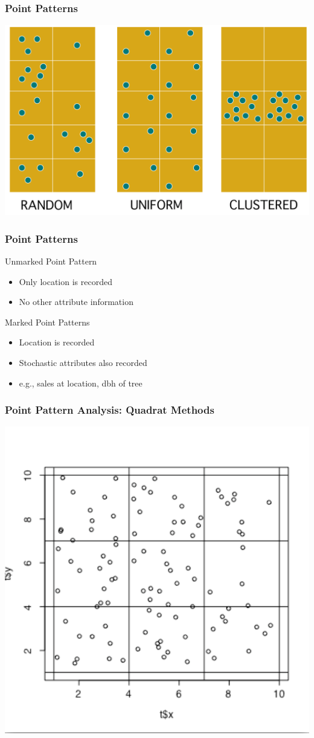 \documentclass[nototal]{beamer}
\begin{document}
    \begin{frame}
      \frametitle{Point Patterns}
      \begin{center}
	\includegraphics[width=.65\linewidth]{pointtypes.pdf}
      \end{center}
    \end{frame}
    \begin{frame}
      \frametitle{Point Patterns}
      \begin{block}{Unmarked Point Pattern}
	\begin{itemize}
	  \item Only location is recorded
	  \item No other attribute information
	\end{itemize}
      \end{block}
      \begin{block}{Marked Point Patterns}
	\begin{itemize}
	  \item Location is recorded
	  \item Stochastic attributes also recorded
	  \item e.g., sales at location, dbh of tree
	\end{itemize}
      \end{block}
    \end{frame}

    \begin{frame}
       \frametitle{Point Pattern Analysis: Quadrat Methods}
       \begin{center}
	 \includegraphics[width=.65\linewidth]{plotquad.pdf}
       \end{center}
     \end{frame}
\end{document}
